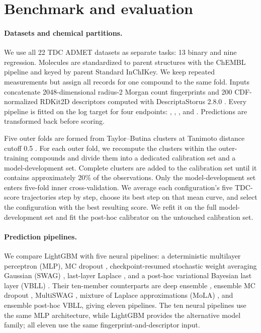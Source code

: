 \section{Benchmark and evaluation}
\label{sec:methods}

\paragraph{Datasets and chemical partitions.}
We use all 22 TDC ADMET datasets as separate tasks: 13 binary and nine regression. Molecules are
standardized to parent structures with the ChEMBL pipeline \citep{bento2020chembl} and keyed by
parent Standard InChIKey. We keep repeated measurements but assign all records for one compound to
the same fold. Inputs concatenate 2048-dimensional radius-2 Morgan count fingerprints
\citep{rogers2010morgan} and 200 CDF-normalized RDKit2D descriptors computed with DescriptaStorus
2.8.0 \citep{kelley2024descriptastorus}. Every pipeline is fitted on the log target for four endpoints:
, ,
, and . Predictions are
transformed back before scoring.

Five outer folds are formed from Taylor--Butina clusters at Tanimoto distance cutoff 0.5
\citep{butina1999clustering}. For each outer fold, we recompute the clusters within the outer-training
compounds and divide them into a dedicated calibration set and a model-development set. Complete
clusters are added to the calibration set until it contains approximately 20\% of the observations.
Only the model-development set enters five-fold inner cross-validation. We average each
configuration's five TDC-score trajectories step by step, choose its best step on that mean curve,
and select the configuration with the best resulting score. We refit it on the full model-development
set and fit the post-hoc calibrator on the untouched calibration set.

\paragraph{Prediction pipelines.}
We compare LightGBM \citep{ke2017lightgbm} with five neural pipelines: a deterministic multilayer
perceptron (MLP), MC dropout \citep{gal2016dropout}, checkpoint-resumed stochastic
weight averaging Gaussian (SWAG) \citep{maddox2019swag}, last-layer Laplace
\citep{daxberger2021laplace}, and a post-hoc variational Bayesian last layer (VBLL)
\citep{harrison2024vbll}. Their ten-member
counterparts are deep ensemble \citep{lakshminarayanan2017deep}, ensemble MC dropout
\citep{filos2019systematic}, MultiSWAG \citep{wilson2020bayesian}, mixture of Laplace approximations
(MoLA) \citep{eschenhagen2021mixtures}, and ensemble post-hoc VBLL, giving eleven pipelines. The ten
neural pipelines use the same MLP architecture, while LightGBM provides the alternative model family;
all eleven use the same fingerprint-and-descriptor input.

